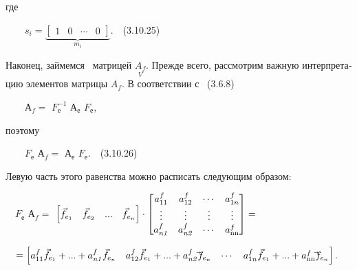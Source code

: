 \documentclass[a4paper]{article}
\newcommand\normalsubformula[1]{\text{\mathversion{normal}$#1$}}
\begin{document}
{\begin{russian}\sffamily
где
\end{russian}}

{\begin{russian}\sffamily
\ \ \ \  $s_i=\underbrace{\left[\begin{matrix}1&0&\cdots &0\end{matrix}\right]}_{m_i}$.\ \ (3.10.25)
\end{russian}}

{\begin{russian}\sffamily
Наконец, займемся \ матрицей  $\underset V{A_f}$. Прежде всего, рассмотрим важную интерпретацию элементов матрицы 
$A_f$. В соответствии с \ (3.6.8)
\end{russian}}

{\begin{russian}\sffamily
\ \ \ \  $А_f=$ $F_е^{-1}$ $А_е$ $F_е$,
\end{russian}}

{\begin{russian}\sffamily
поэтому
\end{russian}}

{\begin{russian}\sffamily
\ \ \ \  $F_е$ $А_f=$ $А_е$ $F_е$.\ \ (3.10.26)
\end{russian}}

{\begin{russian}\sffamily
Левую часть этого равенства можно расписать следующим образом:
\end{russian}}

{\begin{russian}\sffamily
\ \  $F_е$ $А_f=$ $\left[\begin{matrix}\vec f_{e_1}&\vec f_{e_2}&...&\vec f_{e_n}\end{matrix}\right]\cdot
\left[\begin{matrix}a_{11}^f&a_{12}^f&\cdots &a_{1n}^f\\\vdots &\vdots &\vdots &\vdots
\\a_{\mathit{n1}}^f&a_{\mathit{n2}}^f&\cdots &a_{\normalsubformula{\text{nn}}}^f\end{matrix}\right]=$
\end{russian}}

{\begin{russian}\sffamily
\ \  $=\left[\begin{matrix}a_{11}^f\vec f_{e_1}+...+a_{\mathit{n1}}^f\vec f_{e_n}&a_{12}^f\vec
f_{e_1}+...+a_{\mathit{n2}}^f\vec{}f_{e_n}&\cdots &a_{1n}^f\vec
f_{e_1}+...+a_{\normalsubformula{\text{nn}}}^f\vec{}f_{e_n}\end{matrix}\right]$.
\end{russian}}
\end{document}
